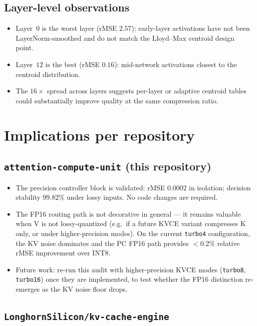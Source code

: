 \documentclass[11pt]{article}
\begin{document}
\subsection*{Layer-level observations}

\begin{itemize}
\item Layer~$0$ is the worst layer (rMSE $2.57$): early-layer
activations have not been LayerNorm-smoothed and do not match
the Lloyd--Max centroid design point.
\item Layer~$12$ is the best (rMSE $0.16$): mid-network activations
closest to the centroid distribution.
\item The $16\times$ spread across layers suggests per-layer or
adaptive centroid tables could substantially improve quality at
the same compression ratio.
\end{itemize}

\section{Implications per repository}
\label{sec:implications}

\subsection{\texttt{attention-compute-unit} (this repository)}

\begin{itemize}
\item The precision controller block is validated: rMSE $0.0002$
in isolation; decision stability $99.82\%$ under lossy inputs.
No code changes are required.
\item The FP16 routing path is not decorative in general --- it
remains valuable when V is not lossy-quantized (e.g.\ if a future
KVCE variant compresses K only, or under higher-precision modes).
On the current \texttt{turbo4} configuration, the KV noise
dominates and the PC FP16 path provides $< 0.2\%$ relative rMSE
improvement over INT8.
\item Future work: re-run this audit with higher-precision KVCE
modes (\texttt{turbo8}, \texttt{turbo16}) once they are implemented,
to test whether the FP16 distinction re-emerges as the KV noise
floor drops.
\end{itemize}

\subsection{\texttt{LonghornSilicon/kv-cache-engine}}
\end{document}
